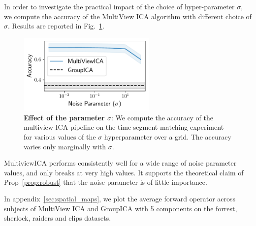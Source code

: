 In order to investigate the practical impact of the choice of hyper-parameter
$\sigma$, we compute the accuracy of the MultiView ICA algorithm with different
choice of $\sigma$.
Results are reported in Fig.~\ref{fig:supp_noise_sensitivity}. 
\begin{figure}
  \centering
  \includegraphics[width=0.6\textwidth]{figures/mvica/noise_sensitivity_reb.pdf}
  \caption{\textbf{Effect of the parameter $\sigma$}: We compute the accuracy of the multiview-ICA pipeline on the time-segment matching experiment for various values of the $\sigma$ hyperparameter over a grid. The accuracy varies only marginally with $\sigma$.}
  \label{fig:supp_noise_sensitivity}
\end{figure}
MultiviewICA performs consistently well for a wide range of noise parameter values, and only breaks at very high values. It supports the theoretical claim of Prop~\ref{prop:robust} that the noise parameter is of little importance.

In appendix~\ref{sec:spatial_maps}, we plot the average forward operator across subjects of MultiView ICA and GroupICA with 5 components on the forrest, sherlock, raiders and clips datasets.


